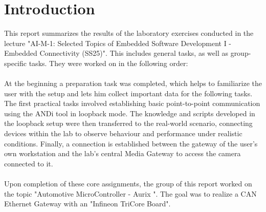 \section{Introduction}
\label{sec:introduction}

This report summarizes the results of the laboratory exercises conducted in the lecture "AI-M-1: Selected Topics of Embedded Software Development I - Embedded Connectivity (SS25)". This includes general tasks, as well as group-specific tasks. They were worked on in the following order: \\\\
At the beginning a preparation task was completed, which helps to familiarize the user with the setup and lets him collect important data for the following tasks. The first practical tasks involved establishing basic point-to-point communication using the ANDi tool in loopback mode. The knowledge and scripts developed in the loopback setup were then transferred to the real-world scenario, connecting devices within the lab to observe behaviour and performance under realistic conditions. Finally, a connection is established between the gateway of the user's own workstation and the lab's central Media Gateway to access the camera connected to it. \\\\
Upon completion of these core assignments, the group of this report worked on the topic "Automotive MicroController - Aurix ". The goal was to realize a CAN Ethernet Gateway with an "Infineon TriCore Board".

